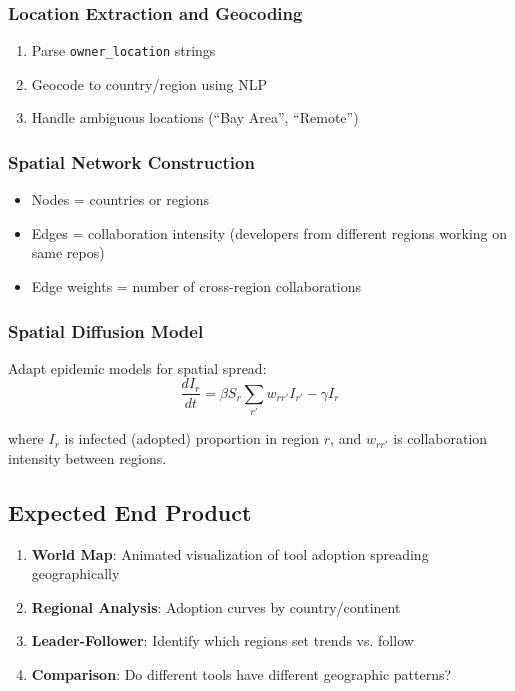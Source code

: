 \documentclass[11pt,letterpaper]{article}
\begin{document}
\subsubsection{Location Extraction and Geocoding}

\begin{enumerate}
    \item Parse \texttt{owner\_location} strings
    \item Geocode to country/region using NLP
    \item Handle ambiguous locations (``Bay Area'', ``Remote'')
\end{enumerate}

\subsubsection{Spatial Network Construction}

\begin{itemize}
    \item Nodes = countries or regions
    \item Edges = collaboration intensity (developers from different regions working on same repos)
    \item Edge weights = number of cross-region collaborations
\end{itemize}

\subsubsection{Spatial Diffusion Model}

Adapt epidemic models for spatial spread:
\[
\frac{dI_r}{dt} = \beta S_r \sum_{r'} w_{rr'} I_{r'} - \gamma I_r
\]

where $I_r$ is infected (adopted) proportion in region $r$, and $w_{rr'}$ is collaboration intensity between regions.

\subsection{Expected End Product}

\begin{enumerate}
    \item \textbf{World Map}: Animated visualization of tool adoption spreading geographically
    \item \textbf{Regional Analysis}: Adoption curves by country/continent
    \item \textbf{Leader-Follower}: Identify which regions set trends vs. follow
    \item \textbf{Comparison}: Do different tools have different geographic patterns?
\end{enumerate}
\end{document}
